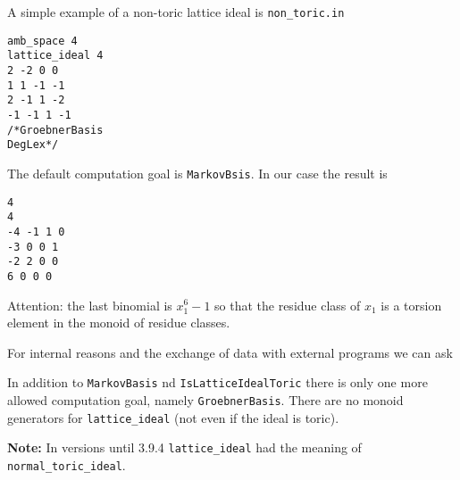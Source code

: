 A simple example of a non-toric lattice ideal is \verb|non_toric.in|
\begin{Verbatim}
amb_space 4
lattice_ideal 4
2 -2 0 0
1 1 -1 -1
2 -1 1 -2
-1 -1 1 -1
/*GroebnerBasis
DegLex*/
\end{Verbatim}
The default computation goal is \verb|MarkovBsis|. In our case the result is
\begin{Verbatim}
4
4
-4 -1 1 0 
-3 0 0 1 
-2 2 0 0 
6 0 0 0
\end{Verbatim}
Attention: the last binomial is $x_1^6-1$ so that the residue class of $x_1$ is a torsion element in the monoid of residue classes.

For internal reasons and the exchange of data with external programs we can ask
\begin{itemize}
 \itemtt[IsLatticeIdealToric]
\end{itemize}

In addition to \verb|MarkovBasis| nd \verb|IsLatticeIdealToric| there is only one more allowed computation goal, namely \verb|GroebnerBasis|. There are no monoid generators for \verb|lattice_ideal| (not even if the ideal is toric).

\textbf{Note:} In versions until 3.9.4 \verb|lattice_ideal| had the meaning of \verb|normal_toric_ideal|.
